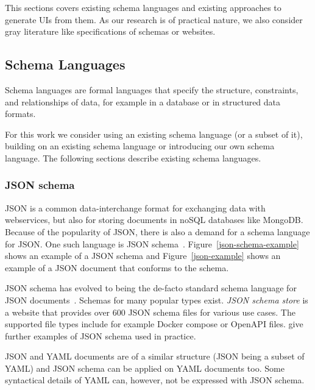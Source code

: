 
This sections covers existing schema languages and existing approaches to generate UIs from them.
As our research is of practical nature, we also consider gray literature like specifications of schemas or websites.
\subsection{Schema Languages}\label{subsec:schemalanguages}

Schema languages are formal languages that specify the structure, constraints, and relationships of data, for example in a database or in structured data formats.

For this work we consider using an existing schema language (or a subset of it), building on an existing schema language or introducing our own schema language.
The following sections describe existing schema languages.

\subsubsection{JSON schema}

JSON is a common data-interchange format for exchanging data with webservices, but also for storing documents in noSQL databases like MongoDB\@.
Because of the popularity of JSON, there is also a demand for a schema language for JSON\@.
One such language is JSON schema~\cite{jsonSchema, jsonschemaJSONSchema}.
Figure~\ref{json-schema-example} shows an example of a JSON schema and Figure~\ref{json-example} shows an example of a JSON document that conforms to the schema.

JSON schema has evolved to being the de-facto standard schema language for JSON documents~\cite{baazizi2021empirical}.
Schemas for many popular \cfgfile{} types exist.
\textit{JSON schema store}\cite{schemastoreJSONSchema} is a website that provides over 600 JSON schema files for various use cases.
The supported file types include for example Docker compose or OpenAPI files.
\cite{barbaglia, ChaeronySiffa2022} give further examples of JSON schema used in practice.

JSON and YAML documents are of a similar structure (JSON being a subset of YAML) and JSON schema can be applied on YAML documents too.
Some syntactical details of YAML can, however, not be expressed with JSON schema. %

